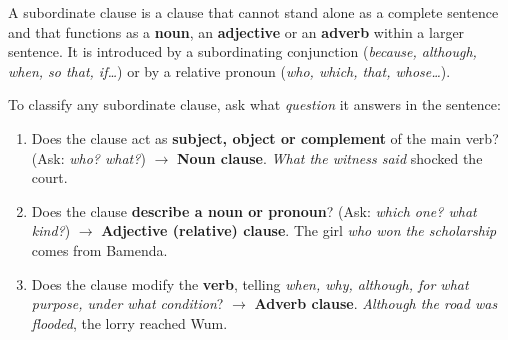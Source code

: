 \documentclass[11pt]{article}
\newcommand{\cle}[1]{{\popxbold\color{popdark}#1}}
\begin{document}
\begin{definition}
A \cle{subordinate clause} is a clause that cannot stand alone as a complete sentence and that functions as a \textbf{noun}, an \textbf{adjective} or an \textbf{adverb} within a larger sentence. It is introduced by a subordinating conjunction (\emph{because, although, when, so that, if\ldots}) or by a relative pronoun (\emph{who, which, that, whose\ldots}).
\end{definition}

\begin{methode}
To classify any subordinate clause, ask what \emph{question} it answers in the sentence:
\begin{enumerate}
\item Does the clause act as \textbf{subject, object or complement} of the main verb? (Ask: \emph{who? what?}) $\rightarrow$ \textbf{Noun clause}. \emph{What the witness said} shocked the court.
\item Does the clause \textbf{describe a noun or pronoun}? (Ask: \emph{which one? what kind?}) $\rightarrow$ \textbf{Adjective (relative) clause}. The girl \emph{who won the scholarship} comes from Bamenda.
\item Does the clause modify the \textbf{verb}, telling \emph{when, why, although, for what purpose, under what condition}? $\rightarrow$ \textbf{Adverb clause}. \emph{Although the road was flooded}, the lorry reached Wum.
\end{enumerate}
\end{methode}
\end{document}

